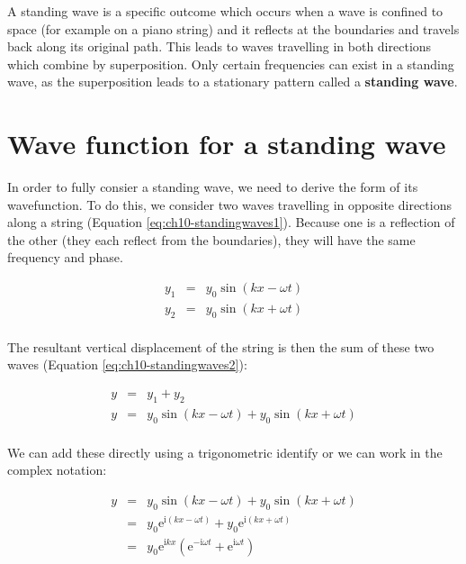 \documentclass[
]{book}
\begin{document}
A standing wave is a specific outcome which occurs when a wave is confined to space (for example on a piano string) and it reflects at the boundaries and travels back along its original path. This leads to waves travelling in both directions which combine by superposition. Only certain frequencies can exist in a standing wave, as the superposition leads to a stationary pattern called a \textbf{standing wave}.

\hypertarget{sec:ch10-standingwaves2}{%
\section{Wave function for a standing wave}\label{sec:ch10-standingwaves2}}

In order to fully consier a standing wave, we need to derive the form of its wavefunction. To do this, we consider two waves travelling in opposite directions along a string (Equation \eqref{eq:ch10-standingwaves1}). Because one is a reflection of the other (they each reflect from the boundaries), they will have the same frequency and phase.

\begin{equation}
\begin{array}{rcl}
y_1 &=& y_0 \sin (kx - \omega t) \\
y_2 &=& y_0 \sin (kx + \omega t) \\
\end{array}
\label{eq:ch10-standingwaves1}
\end{equation}

The resultant vertical displacement of the string is then the sum of these two waves (Equation \eqref{eq:ch10-standingwaves2}):

\begin{equation}
\begin{array}{rcl}
y &=& y_1 + y_2 \\
y &=& y_0 \sin (kx - \omega t) + y_0 \sin (kx + \omega t) \\
\end{array}
\label{eq:ch10-standingwaves2}
\end{equation}

We can add these directly using a trigonometric identify or we can work in the complex notation:

\begin{equation}
\begin{array}{rcl}
y &=& y_0 \sin (kx - \omega t) + y_0 \sin (kx + \omega t) \\
 &=& y_0 \mathrm{e}^{\mathrm{i}(kx - \omega t)} + y_0 \mathrm{e}^{\mathrm{i}(kx + \omega t)} \\
 &=& y_0 \mathrm{e}^{\mathrm{i}kx} \left( \mathrm{e}^{-\mathrm{i}\omega t} + \mathrm{e}^{\mathrm{i}\omega t} \right)
\end{array}
\label{eq:ch10-standingwaves3}
\end{equation}
\end{document}
